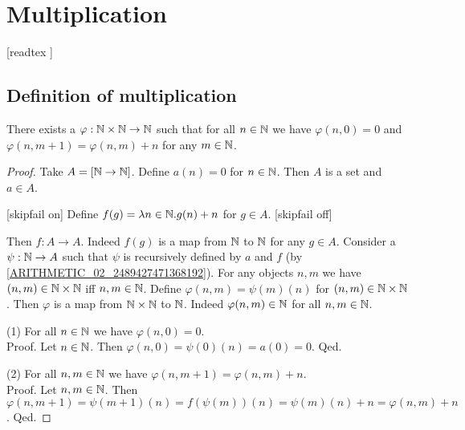\documentclass[../arithmetic.tex]{subfiles}
\begin{document}
  \chapter{Multiplication}\label{chapter:multiplication}


  \begin{forthel}

    [readtex ]

  \end{forthel}


  \section{Definition of multiplication}

  \begin{forthel}
    \begin{lemma}
      There exists a $\varphi : \mathbb{N} \times \mathbb{N} \to \mathbb{N}$ such
      that for all $n \in \mathbb{N}$ we have $\varphi(n, 0) = 0$ and
      $\varphi(n, m + 1) = \varphi(n,m) + n$ for any $m \in \mathbb{N}$.
    \end{lemma}
    \begin{proof}
      Take $A = [\mathbb{N} \to \mathbb{N}]$.
      Define $a(n) = 0$ for $n \in \mathbb{N}$.
      Then $A$ is a set and $a \in A$.

      [skipfail on] %
      Define $f(g) = \mathrm{\lambda} n \in \mathbb{N}. g(n) + n$ for $g \in A$.
      [skipfail off]

      Then $f : A \to A$.
      Indeed $f(g)$ is a map from $\mathbb{N}$ to $\mathbb{N}$ for any $g \in A$.
      Consider a $\psi : \mathbb{N} \to A$ such that $\psi$ is recursively defined by
      $a$ and $f$ (by \cref{ARITHMETIC_02_2489427471368192}).
      For any objects $n, m$ we have $(n,m) \in \mathbb{N} \times \mathbb{N}$ iff
      $n, m \in \mathbb{N}$.
      Define $\varphi(n,m) = \psi(m)(n)$ for $(n,m) \in \mathbb{N} \times \mathbb{N}$.
      Then $\varphi$ is a map from $\mathbb{N} \times \mathbb{N}$ to $\mathbb{N}$.
      Indeed $\varphi(n,m) \in \mathbb{N}$ for all $n, m \in \mathbb{N}$.

      (1) For all $n \in \mathbb{N}$ we have $\varphi(n,0) = 0$. \\
      Proof.
        Let $n \in \mathbb{N}$.
        Then $\varphi(n,0)
          = \psi(0)(n)
          = a(0)
          = 0$.
      Qed.

      (2) For all $n, m \in \mathbb{N}$ we have $\varphi(n, m + 1) =
      \varphi(n,m) + n$. \\
      Proof.
        Let $n, m \in \mathbb{N}$.
        Then $\varphi(n, m + 1)
          = \psi(m + 1)(n)
          = f(\psi(m))(n)
          = \psi(m)(n) + n
          = \varphi(n,m) + n$.
      Qed.
    \end{proof}
  \end{forthel}
\end{document}

